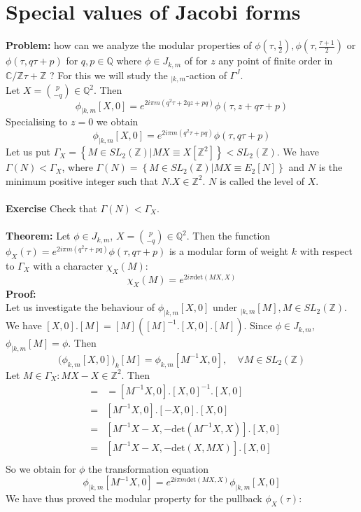 \documentclass[10pt,a4paper]{article}
\begin{document}
\section{Special values of Jacobi forms}
\textbf{Problem:} how can we analyze the modular properties of $\phi(\tau,\frac{1}{2}), \phi(\tau,\frac{\tau+1}{2})$ or $\phi(\tau,q\tau+p)$ for $q,p\in\mathbb{Q}$ where $\phi\in J_{k,m}$ of for $z$ any point of finite order in $\mathbb{C}/\mathbb{Z}\tau+\mathbb{Z}$ ? For this we will study the $_{|k,m}$-action of $\Gamma^J$.\\
Let $X=\binom{p}{-q}\in\mathbb{Q}^2$. Then 
\[\phi_{|k,m}[X,0]=e^{2i\pi m(q^2\tau+2qz+pq)}\phi(\tau,z+q\tau+p)\]
Specialising to $z=0$ we obtain
\[\phi_{|k,m}[X,0]=e^{2i\pi m(q^2\tau+pq)}\phi(\tau,q\tau+p)\]
Let us put $\Gamma_X=\left\{M\in SL_2(\mathbb{Z})|MX\equiv X[\mathbb{Z}^2]\right\}<SL_2(\mathbb{Z})$.
We have $\Gamma(N)<\Gamma_X$, where $\Gamma(N)=\left\{M\in SL_2(\mathbb{Z})|MX\equiv E_2[N]\right\}$ and $N$ is the minimum positive integer such that $N.X\in\mathbb{Z}^2$. $N$ is called the level of $X$.
\\
\\
\textbf{Exercise} Check that $\Gamma(N)<\Gamma_X$.
\\
\\
\textbf{Theorem:} Let $\phi\in J_{k,m}$, $X=\binom{p}{-q}\in\mathbb{Q}^2$. Then the function $\phi_X(\tau)=e^{2i\pi m(q^2\tau+pq)}\phi(\tau,q\tau+p)$ is a modular form of weight $k$ with respect to $\Gamma_X$ with a character $\chi_X(M)$:
\[\chi_X(M)=e^{2i\pi\textrm{det}(MX,X)}\]
\textbf{Proof:}
\\
Let us investigate the behaviour of $\phi_{|k,m}[X,0]$ under $_{|k,m}[M],M\in SL_2(\mathbb{Z})$. We have $[X,0].[M]=[M]\left([M]^{-1}.[X,0].[M]\right)$. Since $\phi\in J_{k,m}$, $\phi_{|k,m}[M]=\phi$. Then
\[\big(\phi_{k,m}[X,0]\big)_{k}[M]=\phi_{k,m}[M^{-1}X,0],\quad\forall M\in SL_2(\mathbb{Z})\]
Let $M\in\Gamma_X:MX-X\in\mathbb{Z}^2$. Then
\begin{eqnarray*}
[M^{-1}X,0]&=&=[M^{-1}X,0].[X,0]^{-1}.[X,0]\\
&=&[M^{-1}X,0].[-X,0].[X,0]\\
&=&[M^{-1}X-X,-\textrm{det}(M^{-1}X,X)].[X,0]\\
&=&[M^{-1}X-X,-\textrm{det}(X,MX)].[X,0]\\
\end{eqnarray*}
So we obtain for $\phi$ the transformation equation 
\[\phi_{|k,m}[M^{-1}X,0]=e^{2i\pi m\textrm{det}(MX,X)}\phi_{|k,m}[X,0]\]
We have thus proved the modular property for the pullback $\phi_X(\tau)$:
\end{document}
